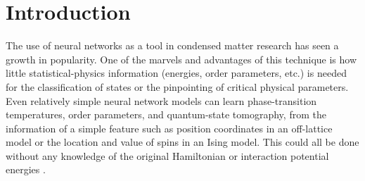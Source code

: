 \section{Introduction}

The use of neural networks as a tool in condensed matter research has seen a growth in popularity. One of the marvels and advantages of this technique is how little statistical-physics information (energies, order parameters, etc.) is needed for the classification of states or the pinpointing of critical physical parameters.
Even relatively simple neural network models can learn phase-transition temperatures, order parameters, and quantum-state tomography, from the information of a simple feature such as position coordinates in an off-lattice model or the location and value of spins in an Ising model. This could all be done without any knowledge of the original Hamiltonian or interaction potential energies \cite{torlaiboltzmann,carras,wei,wetzel,torlai,morningstar,beach}.


